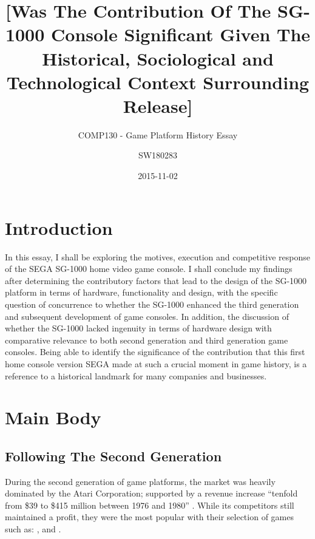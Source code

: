 \documentclass{scrartcl}
\title{[Was The Contribution Of The SG-1000 Console Significant Given The Historical, Sociological and Technological Context Surrounding Release]}
\subtitle{COMP130 - Game Platform History Essay}
\date{2015-11-02}
\author{SW180283}
\begin{document}
	\maketitle
	\newpage
	\tableofcontents
	\newpage
	
	\section{Introduction}

In this essay, I shall be exploring the motives, execution and competitive response of the SEGA SG-1000 home video game console. I shall conclude my findings after determining the contributory factors that lead to the design of the SG-1000 platform in terms of hardware, functionality and design, with the specific question of concurrence to whether the SG-1000 enhanced the third generation and subsequent development of game consoles. In addition, the discussion of whether the SG-1000 lacked ingenuity in terms of hardware design with comparative relevance to both second generation and third generation game consoles. Being able to identify the significance of the contribution that this first home console version SEGA made at such a crucial moment in game history, is a reference to a historical landmark for many companies and businesses.

	\section{Main Body}
	\subsection{Following The Second Generation}
	
During the second generation of game platforms, the market was heavily dominated by the Atari Corporation; supported by a revenue increase “tenfold from \$39 to \$415 million between 1976 and 1980” \cite{Sutton1986}. While its competitors still maintained a profit, they were the most popular with their selection of games such as: \cite{game:MissionControl}, \cite{game:SpaceInvaders} and \cite{game:Asteroids}.
\end{document}
